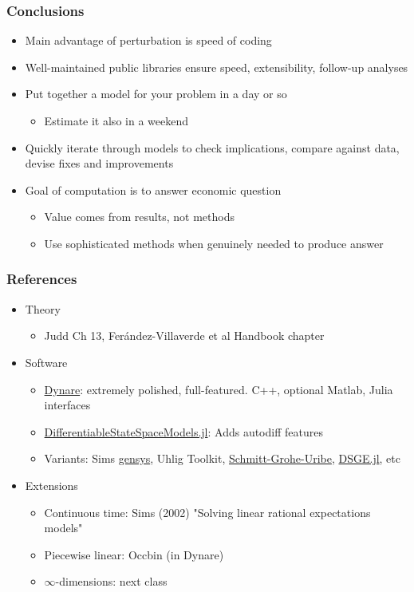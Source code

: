 \documentclass[bigger,handout]{beamer}
\begin{document}
\begin{frame}
\frametitle{Conclusions}
\begin{itemize}
\item Main advantage of perturbation is speed of coding
\item Well-maintained public libraries ensure speed, extensibility, follow-up analyses
\item Put together a model for your problem in a day or so
\begin{itemize}
\item Estimate it also in a weekend
\end{itemize}
\item Quickly iterate through models to check implications, compare against data, devise fixes and improvements
\item Goal of computation is to answer economic question
\begin{itemize}
\item Value comes from results, not methods
\item Use sophisticated methods when genuinely needed to produce answer
\end{itemize}


\end{itemize}

\end{frame}

\begin{frame}
\frametitle{References}

\begin{itemize}
\item Theory
\begin{itemize}
\item Judd Ch 13, Fer\'{a}ndez-Villaverde et al Handbook chapter
\end{itemize}
\item Software
\begin{itemize}
\item \href{https://www.dynare.org/}{Dynare}: extremely polished, full-featured. C++, optional Matlab, Julia interfaces 
\item \href{https://github.com/HighDimensionalEconLab/DifferentiableStateSpaceModels.jl}{DifferentiableStateSpaceModels.jl}: Adds autodiff features
\item Variants: Sims \href{http://sims.princeton.edu/yftp/gensys/}{gensys}, Uhlig Toolkit, \href{https://www1.columbia.edu/~ss3501/}{Schmitt-Grohe-Uribe}, \href{https://frbny-dsge.github.io/DSGE.jl/}{DSGE.jl}, etc
\end{itemize}
\item{Extensions}
\begin{itemize}
\item Continuous time: Sims (2002) "Solving linear rational expectations models"
\item Piecewise linear: Occbin (in Dynare)
\item $\infty$-dimensions: next class
\end{itemize}


\end{itemize}

\end{frame}
\end{document}
